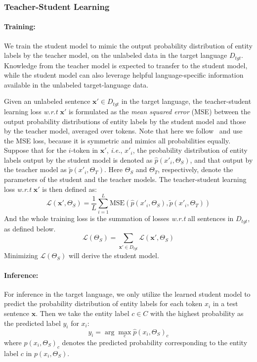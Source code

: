 \documentclass[11pt,a4paper]{article}
\newcommand\ie{\textit{i.e.}}
\newcommand\wrt{\textit{w.r.t}}
\begin{document}
	\subsubsection{Teacher-Student Learning}
	\paragraph{Training: } We train the student model to mimic the output probability distribution of entity labels by the teacher model, on the unlabeled data in the target language $D_{tgt}$. 
	Knowledge from the teacher model is expected to transfer to the student model, while the student model can also leverage helpful language-specific information available in the unlabeled target-language data.
	
	Given an unlabeled sentence $\bm{x'} \in D_{tgt}$ in the target language, the teacher-student learning loss \wrt{}  $\bm{x'}$ is formulated as the \textit{mean squared error} (MSE) between the output probability distributions of entity labels by the student model and those by the teacher model, averaged over tokens. 
	Note that here we follow~\citet{yang2019model} and use the MSE loss, because it is symmetric and mimics all probabilities equally.
	Suppose that for the $i$-token in $\bm{x'}$, \ie, $x'_i$, the probability distribution of entity labels output by the student model is denoted as $\hat{p}(x'_i, \Theta_S)$, and that output by the teacher model as $\tilde{p}(x'_i, \Theta_T)$. Here $\Theta_S$ and $\Theta_T$, respectively, denote the  parameters of the student and the teacher models. The teacher-student learning loss \wrt{} $\bm{x'}$ is then defined as:
	\begin{equation}
	\label{equ:loss}
	\mathcal{L}(\bm{x'}, \Theta_S) = \frac{1}{L}\sum_{i=1}^L\text{MSE}\left( \hat{p}(x'_i, \Theta_S), \tilde{p}(x'_i, \Theta_T) \right)
	\end{equation}
	And the whole training loss is the summation of losses \wrt{} all sentences in $D_{tgt}$, as defined below.
	\begin{equation}
	\label{equ:train_loss}
	\mathcal{L}(\Theta_S) = \sum_{\bm{x'} \in D_{tgt}} \mathcal{L}(\bm{x'}, \Theta_S)
	\end{equation}
	Minimizing $\mathcal{L}(\Theta_S)$ will derive the student model.
	
	\paragraph{Inference: } For inference in the target language, we only utilize the learned student model to predict the probability distribution of entity labels for each token $x_i$ in a test sentence $\bm{x}$. Then we take the entity label $c \in C$ with the highest probability as the predicted label $y_i$ for $x_i$:
	\begin{equation}
	\label{equ:infer}
	y_i = \arg\max_c \hat{p}(x_i, \Theta_S)_c
	\end{equation}
	where $p(x_i, \Theta_S)_c$ denotes the predicted probability corresponding to the entity label $c$ in $p(x_i, \Theta_S)$. 
	
\end{document}
